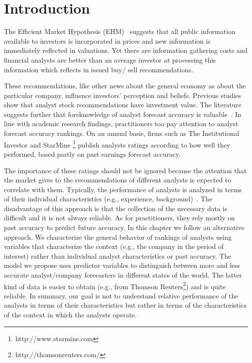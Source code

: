 




\section{Introduction}
\label{ch3-sec:introduction}

The Efficient Market Hypothesis (EHM)~\citep{fama1970ecm} suggests that all public information available to investors is incorporated in prices and new information is immediately reflected in valuations. Yet there are information gathering costs and financial analysts are better than an average investor at processing this information which reflects in issued buy/ sell recommendations.

These recommendations, like other news about the general economy as about the particular company, influence investors' perception and beliefs. Previous studies show that analyst stock recommendations have investment value. The literature suggests further that foreknowledge of analyst forecast accuracy is valuable~\citep{brown2003}. In line with academic research findings, practitioners too pay attention to analyst forecast accuracy rankings. On an annual basis, firms such as The Institutional Investor and StarMine \footnote{http://www.starmine.com} publish analysts ratings according to how well they performed, based partly on past earnings forecast accuracy.

The importance of these ratings should not be ignored because the attention that the market gives to the recommendations of different analysts is expected to correlate with them. Typically, the performance of analysts is analyzed in terms of their individual characteristics (e.g., experience, background)~\citep{clement1999}. The disadvantage of this approach is that the collection of the necessary data is difficult and it is not always reliable. As for practitioners, they rely mostly on past accuracy to predict future accuracy. In this chapter we follow an alternative approach. We characterize the general behavior of rankings of analysts using variables that characterize the context (e.g., the company in the period of interest) rather than individual analyst characteristics or past accuracy. The model we propose uses predictor variables to distinguish between more and less accurate analyst/company forecasters in different states of the world. The latter kind of data is easier to obtain (e.g., from Thomson Reuters\footnote{http://thomsonreuters.com/}) and is quite reliable. In summary, our goal is not to understand  relative performance of the analysts  in terms of their characteristics but rather in terms of the characteristics of the context in which the analysts operate.


